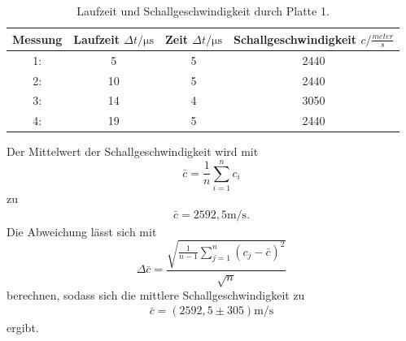 \begin{table}[H]
  \centering
  \caption{Laufzeit und Schallgeschwindigkeit durch Platte 1.}
  \label{tab:ImpLaufzeit}
  \begin{tabular}{S[table-format=1.0] S[table-format=1.0] S[table-format=2.0] S[table-format=4.0] }
  \toprule
  {Messung} & {Laufzeit $\Delta t / \si{\micro\second}$} & {Zeit $\Delta t / \si{\micro\second}$} & {Schallgeschwindigkeit $c / \frac{\si{meter}}{\si{\second}}$}\\
  : &  5   & 5 & 2440  \\
  2: &  10  & 5 & 2440  \\
  3: &  14  & 4 & 3050  \\
  4: &  19  & 5 & 2440  \\
  \bottomrule
  \end{tabular}
\end{table}
Der Mittelwert der Schallgeschwindigkeit wird mit 
\begin{equation}
  \bar{c}=\frac{1}{n} \sum_{i=1}^n c_i \label{eqn:Mittelwert}
\end{equation}
zu
\begin{align*}
  \bar{c}=2592,5 \si{\meter\per\second}.
\end{align*}
Die Abweichung lässt sich mit
\begin{equation}
  \Delta \bar{c} = \frac{\sqrt{\frac{1}{n-1}\sum_{j=1}^n (c_j-\bar{c})^2}}{\sqrt{n}} \label{eqn:standabw}
\end{equation}
berechnen, sodass sich die mittlere Schallgeschwindigkeit zu
\begin{align*}
  \bar{c}= (2592,5 \pm 305) \si{\meter\per\second}
\end{align*}
ergibt.

